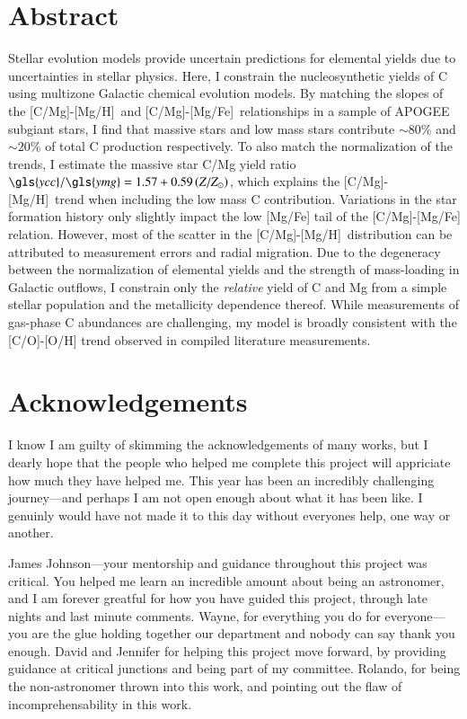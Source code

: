 \documentclass[12pt,oneside,letterpaper]{report}
\newcommand{\Ycc}{\gls{ycc}}
\newcommand{\Yoc}{\gls{ymg}}
\newcommand{\caah}{[C/Mg]-[Mg/H]}
\newcommand{\caafe}{[C/Mg]-[Mg/Fe]}
\newcommand{\about}[1]{${\sim} #1$}
\begin{document}
\chapter*{Abstract}
Stellar evolution models provide uncertain predictions for elemental yields due to uncertainties in stellar physics.
Here, I constrain the nucleosynthetic yields of C using multizone Galactic chemical evolution models.
By matching the slopes of the \caah\ and \caafe\ relationships in a sample of APOGEE subgiant stars, I find that massive stars and low mass stars contribute \about{80\%} and \about{20\%} of total C production respectively.
% 
To also match the normalization of the trends, I estimate the massive star C/Mg yield ratio $\Ycc/\Yoc = 1.57 + 0.59 \left(Z/Z_\odot\right)$, which explains the \caah\ trend when including the low mass C contribution.
%
Variations in the star formation history only slightly impact the low [Mg/Fe] tail of the [C/Mg]-[Mg/Fe] relation. However, most of the scatter in the \caah\ distribution can be attributed to measurement errors and radial migration. 
% 
Due to the degeneracy between the normalization of elemental yields and the strength of mass-loading in Galactic outflows, I constrain only the {\it relative} yield of C and Mg from a simple stellar population and the metallicity dependence thereof. While measurements of gas-phase C abundances are challenging, my model is broadly consistent with the [C/O]-[O/H] trend observed in compiled literature measurements.





\chapter*{Acknowledgements}

I know I am guilty of skimming the acknowledgements of many works, but I dearly hope that the people who helped me complete this project will appriciate how much they have helped me. This year has been an incredibly challenging journey---and perhaps I am not open enough about what it has been like. I genuinly would have not made it to this day without everyones help, one way or another.

James Johnson---your mentorship and guidance throughout this project was critical. 
You helped me learn an incredible amount about being an astronomer, and I am forever greatful for how you have guided this project, through late nights and last minute comments.  Wayne, for everything you do for everyone---you are the glue holding together our department and nobody can say thank you enough. 
David and Jennifer for helping this project move forward, by providing guidance at critical junctions and being part of my committee. Rolando, for being the non-astronomer thrown into this work, and pointing out the flaw of incomprehensability in this work.
\end{document}
